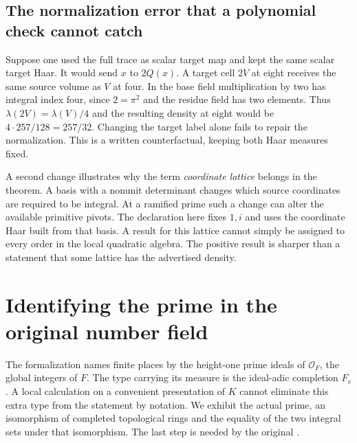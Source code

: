 \documentclass[12pt,letterpaper]{article}
\newcommand{\code}[1]{\texttt{\detokenize{#1}}}
\begin{document}
\subsection{The normalization error that a polynomial check cannot catch}
Suppose one used the full trace as scalar target map and kept the same scalar target Haar. It would send $x$ to $2Q(x)$. A target cell $2V$ at eight receives the same source volume as $V$ at four. In the base field multiplication by two has integral index four, since $2=\pi^2$ and the residue field has two elements. Thus $\lambda(2V)=\lambda(V)/4$ and the resulting density at eight would be $4\cdot257/128=257/32$. Changing the target label alone fails to repair the normalization. This is a written counterfactual, keeping both Haar measures fixed.
\par
A second change illustrates why the term \emph{coordinate lattice} belongs in the theorem. A basis with a nonunit determinant changes which source coordinates are required to be integral. At a ramified prime such a change can alter the available primitive pivots. The declaration here fixes $1,i$ and uses the coordinate Haar built from that basis. A result for this lattice cannot simply be assigned to every order in the local quadratic algebra. The positive result is sharper than a statement that some lattice has the advertised density.
\section{Identifying the prime in the original number field}
The formalization names finite places by the height-one prime ideals of $\mathcal O_F$, the global integers of $F$. The type carrying its measure is the ideal-adic completion $F_v$. A local calculation on a convenient presentation of $K$ cannot eliminate this extra type from the statement by notation. We exhibit the actual prime, an isomorphism of completed topological rings and the equality of the two integral sets under that isomorphism. The last step is needed by the original \code{latV}.
\end{document}
